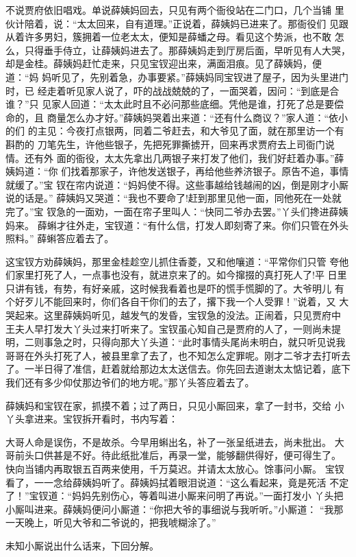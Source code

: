 不说贾府依旧唱戏。单说薛姨妈回去，只见有两个衙役站在二门口，几个当铺
里伙计陪着，说：“太太回来，自有道理。”正说着，薛姨妈已进来了。那衙役们
见跟从着许多男妇，簇拥着一位老太太，便知是薛蟠之母。看见这个势派，也不敢
怎么，只得垂手侍立，让薛姨妈进去了。那薛姨妈走到厅房后面，早听见有人大哭，
却是金桂。薛姨妈赶忙走来，只见宝钗迎出来，满面泪痕。见了薛姨妈，便道：“妈
妈听见了，先别着急，办事要紧。”薛姨妈同宝钗进了屋子，因为头里进门时，已
经走着听见家人说了，吓的战战兢兢的了，一面哭着，因问：“到底是合谁？”只
见家人回道：“太太此时且不必问那些底细。凭他是谁，打死了总是要偿命的，且
商量怎么办才好。”薛姨妈哭着出来道：“还有什么商议？”家人道：“依小的们
的主见：今夜打点银两，同着二爷赶去，和大爷见了面，就在那里访一个有斟酌的
刀笔先生，许他些银子，先把死罪撕掳开，回来再求贾府去上司衙门说情。还有外
面的衙役，太太先拿出几两银子来打发了他们，我们好赶着办事。”薛姨妈道：“你
们找着那家子，许他发送银子，再给他些养济银子。原告不追，事情就缓了。”宝
钗在帘内说道：“妈妈使不得。这些事越给钱越闹的凶，倒是刚才小厮说的话是。”
薛姨妈又哭道：“我也不要命了!赶到那里见他一面，同他死在一处就完了。”宝
钗急的一面劝，一面在帘子里叫人：“快同二爷办去罢。”丫头们搀进薛姨妈来。
薛蝌才往外走，宝钗道：“有什么信，打发人即刻寄了来。你们只管在外头照料。”
薛蝌答应着去了。

这宝钗方劝薛姨妈，那里金桂趁空儿抓住香菱，又和他嚷道：“平常你们只管
夸他们家里打死了人，一点事也没有，就进京来了的。如今撺掇的真打死人了!平
日里只讲有钱，有势，有好亲戚，这时候我看着也是吓的慌手慌脚的了。大爷明儿
有个好歹儿不能回来时，你们各自干你们的去了，撂下我一个人受罪！”说着，又
大哭起来。这里薛姨妈听见，越发气的发昏，宝钗急的没法。正闹着，只见贾府中
王夫人早打发大丫头过来打听来了。宝钗虽心知自己是贾府的人了，一则尚未提
明，二则事急之时，只得向那大丫头道：“此时事情头尾尚未明白，就只听见说我
哥哥在外头打死了人，被县里拿了去了，也不知怎么定罪呢。刚才二爷才去打听去
了。一半日得了准信，赶着就给那边太太送信去。你先回去道谢太太惦记着，底下
我们还有多少仰仗那边爷们的地方呢。”那丫头答应着去了。

薛姨妈和宝钗在家，抓摸不着；过了两日，只见小厮回来，拿了一封书，交给
小丫头拿进来。宝钗拆开看时，书内写着：

大哥人命是误伤，不是故杀。今早用蝌出名，补了一张呈纸进去，尚未批出。
大哥前头口供甚是不好。待此纸批准后，再录一堂，能够翻供得好，便可得生了。
快向当铺内再取银五百两来使用，千万莫迟。并请太太放心。馀事问小厮。
宝钗看了，一一念给薛姨妈听了。薛姨妈拭着眼泪说道：“这么看起来，竟是死活
不定了！”宝钗道：“妈妈先别伤心，等着叫进小厮来问明了再说。”一面打发小
丫头把小厮叫进来。薛姨妈便问小厮道：“你把大爷的事细说与我听听。”小厮道：
“我那一天晚上，听见大爷和二爷说的，把我唬糊涂了。”

未知小厮说出什么话来，下回分解。